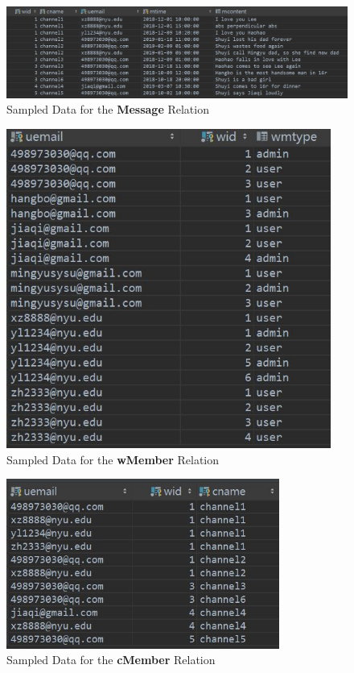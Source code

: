 \FloatBarrier

\begin{figure}[ht!]
    \centering
    \includegraphics[width=1.0\textwidth]{img/Message.JPG}
    \caption{Sampled Data for the \textbf{Message} Relation}
\end{figure}

\FloatBarrier

\begin{figure}[ht!]
    \centering
    \includegraphics[width=0.95\textwidth]{img/wMember.JPG}
    \caption{Sampled Data for the \textbf{wMember} Relation}
\end{figure}

\FloatBarrier

\begin{figure}[ht!]
    \centering
    \includegraphics[width=0.8\textwidth]{img/cMember.JPG}
    \caption{Sampled Data for the \textbf{cMember} Relation}
\end{figure}

